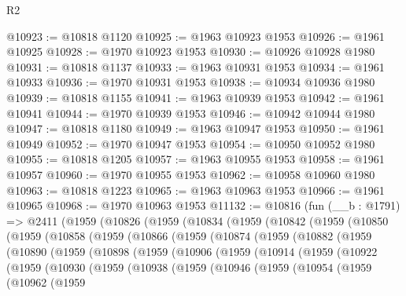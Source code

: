 \begin{lexlean}{R2}
\begin{coremodule}
@10923 := @10818 @1120
@10925 := @1963 @10923 @1953
@10926 := @1961 @10925
@10928 := @1970 @10923 @1953
@10930 := @10926 @10928 @1980
@10931 := @10818 @1137
@10933 := @1963 @10931 @1953
@10934 := @1961 @10933
@10936 := @1970 @10931 @1953
@10938 := @10934 @10936 @1980
@10939 := @10818 @1155
@10941 := @1963 @10939 @1953
@10942 := @1961 @10941
@10944 := @1970 @10939 @1953
@10946 := @10942 @10944 @1980
@10947 := @10818 @1180
@10949 := @1963 @10947 @1953
@10950 := @1961 @10949
@10952 := @1970 @10947 @1953
@10954 := @10950 @10952 @1980
@10955 := @10818 @1205
@10957 := @1963 @10955 @1953
@10958 := @1961 @10957
@10960 := @1970 @10955 @1953
@10962 := @10958 @10960 @1980
@10963 := @10818 @1223
@10965 := @1963 @10963 @1953
@10966 := @1961 @10965
@10968 := @1970 @10963 @1953
@11132 := @10816
    (fun (__b : @1791) =>
    @2411
      (@1959
        (@10826
          (@1959
            (@10834
              (@1959
                (@10842
                  (@1959
                    (@10850
                      (@1959
                        (@10858
                          (@1959
                            (@10866
                              (@1959
                                (@10874
                                  (@1959
                                    (@10882
                                      (@1959
                                        (@10890
                                          (@1959
                                            (@10898
                                              (@1959
                                                (@10906
                                                  (@1959
                                                    (@10914
                                                      (@1959
                                                        (@10922
                                                          (@1959
                                                            (@10930
                                                              (@1959
                                                                (@10938
                                                                  (@1959
                                                                    (@10946
                                                                      (@1959
                                                                        (@10954
                                                                          (@1959
                                                                            (@10962
                                                                              (@1959

\end{coremodule}
\end{lexlean}
